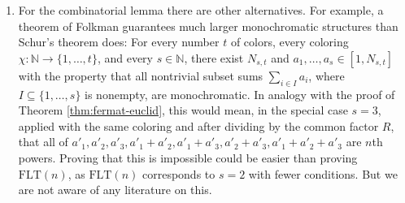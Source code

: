 \documentclass{article}
\theoremstyle{theorem}
\theoremstyle{definition}
\newcommand{\N}{\mathbb N}
\newcommand{\FLT}{\mathrm{FLT}}
\begin{document}
\begin{enumerate}
\item{\label{Folkman}} For the combinatorial lemma there are other alternatives.
For example, a theorem of Folkman  \cite[p.~81]{Graham-Rothschild-Spencer} 
guarantees much larger monochromatic
structures than Schur's theorem does: 
For every number $t$ of colors, every
coloring $\chi: \N \rightarrow \{1, \ldots , t\}$, and every $s\in \N$, 
there exist $N_{s,t}$ and $a_1, \ldots , a_s \in [1,N_{s,t}]$
with the property that all nontrivial subset sums 
$\sum_{i \in I} a_i$, where $I\subseteq \{1, \ldots , s\}$ is nonempty,
are monochromatic.
In analogy with the proof of Theorem \ref{thm:fermat-euclid},
this would mean, in the special case $s=3$, applied with the same coloring 
and after dividing by the common factor $R$, that all of
$a'_1,a'_2,a'_3, a'_1+a'_2,a'_1+a'_3,a'_2+a'_3,a'_1+a'_2+a'_3$ are $n$th
powers. 
Proving that this is impossible could be easier than proving $\FLT(n)$,
as $\FLT(n)$ corresponds to $s=2$ with fewer conditions. But we are not
aware of any literature on this.

\end{enumerate}
\end{document}
